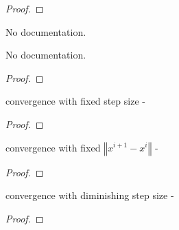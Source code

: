 \begin{proof}
    \leanok
\end{proof}

\begin{definition}\label{subgradient_method}
        \leanok
                No documentation.
    \end{definition}

\begin{theorem}\label{subgradient_method_converge}
        \leanok
                No documentation.
    \end{theorem}

\begin{proof}
    \leanok
\end{proof}

\begin{theorem}\label{subgradient_method_fix_step_size}
        \leanok
                convergence with fixed step size -
    \end{theorem}

\begin{proof}
    \leanok
\end{proof}

\begin{theorem}\label{subgradient_method_fixed_distance}
        \leanok
                convergence with fixed $‖x^{i+1}-x^{i}‖$ -
    \end{theorem}

\begin{proof}
    \leanok
\end{proof}

\begin{theorem}\label{subgradient_method_diminishing_step_size
}
        \leanok
                convergence with diminishing step size -
    \end{theorem}

\begin{proof}
    \leanok
\end{proof}

